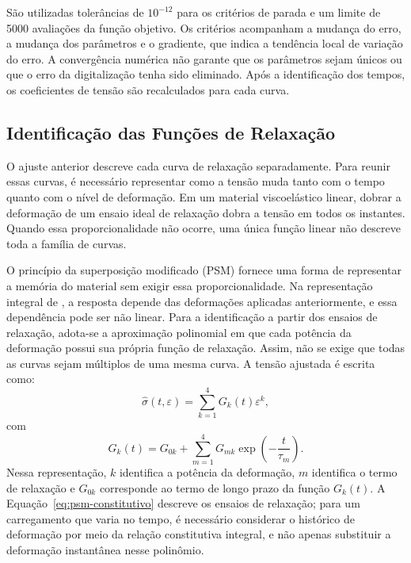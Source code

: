 \documentclass[arial,centeredequations,english,brazilian,oneside,section=TITLE]{ifes8}
\begin{document}
São utilizadas tolerâncias de $10^{-12}$ para os critérios de parada e um limite de
5000 avaliações da função objetivo. Os critérios acompanham a mudança do erro, a mudança
dos parâmetros e o gradiente, que indica a tendência local de variação do erro. A convergência
numérica não garante que os parâmetros sejam únicos ou que o erro da digitalização tenha
sido eliminado. Após a identificação dos tempos, os coeficientes de tensão são recalculados
para cada curva.

\subsection{Identificação das Funções de Relaxação}
\label{sec:identificacao-funcoes-relaxacao}

O ajuste anterior descreve cada curva de relaxação separadamente. Para reunir essas curvas,
é necessário representar como a tensão muda tanto com o tempo quanto com o nível de
deformação. Em um material viscoelástico linear, dobrar a deformação de um ensaio ideal de
relaxação dobra a tensão em todos os instantes. Quando essa proporcionalidade não ocorre,
uma única função linear não descreve toda a família de curvas.

O princípio da superposição modificado (PSM) fornece uma forma de representar a memória
do material sem exigir essa proporcionalidade. Na representação integral de
, a resposta depende das deformações aplicadas anteriormente,
e essa dependência pode ser não linear. Para a identificação a partir dos ensaios de
relaxação, adota-se a aproximação polinomial em que cada potência da deformação possui sua
própria função de relaxação. Assim, não se exige que todas as curvas sejam múltiplos de
uma mesma curva. A tensão ajustada é escrita como:
\begin{equation}
  \label{eq:psm-constitutivo}
  \widehat{\sigma}(t,\varepsilon)
  =\sum_{k=1}^{4}G_k(t)\varepsilon^k,
\end{equation}
com
\begin{equation}
  \label{eq:psm-relaxacao}
  G_k(t)=G_{0k}
  +\sum_{m=1}^{4}G_{mk}\exp\left(-\frac{t}{\tau_m}\right).
\end{equation}
Nessa representação, $k$ identifica a potência da deformação, $m$ identifica o termo de
relaxação e $G_{0k}$ corresponde ao termo de longo prazo da função $G_k(t)$. A
Equação~\eqref{eq:psm-constitutivo} descreve os ensaios de relaxação; para um carregamento
que varia no tempo, é necessário considerar o histórico de deformação por meio da relação
constitutiva integral, e não apenas substituir a deformação instantânea nesse polinômio.
\end{document}
